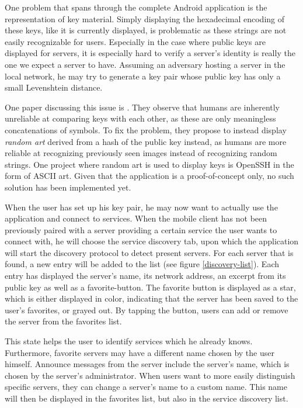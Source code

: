 One problem that spans through the complete Android application is the representation of key material.
Simply displaying the hexadecimal encoding of these keys, like it is currently displayed, is problematic as these strings are not easily recognizable for users.
Especially in the case where public keys are displayed for servers, it is especially hard to verify a server's identity is really the one we expect a server to have.
Assuming an adversary hosting a server in the local network, he may try to generate a key pair whose public key has only a small Levenshtein distance.

One paper discussing this issue is \cite{perrig1999hash}.
They observe that humans are inherently unreliable at comparing keys with each other, as these are only meaningless concatenations of symbols.
To fix the problem, they propose to instead display \emph{random art} derived from a hash of the public key instead, as humans are more reliable at recognizing previously seen images instead of recognizing random strings.
One project where random art is used to display keys is OpenSSH \cite{ylonen1996ssh} in the form of ASCII art.
Given that the application is a proof-of-concept only, no such solution has been implemented yet.

When the user has set up his key pair, he may now want to actually use the application and connect to services.
When the mobile client has not been previously paired with a server providing a certain service the user wants to connect with, he will choose the service discovery tab, upon which the application will start the discovery protocol to detect present servers.
For each server that is found, a new entry will be added to the list (see figure \ref{discovery-list}).
Each entry has displayed the server's name, its network address, an excerpt from its public key as well as a favorite-button.
The favorite button is displayed as a star, which is either displayed in color, indicating that the server has been saved to the user's favorites, or grayed out.
By tapping the button, users can add or remove the server from the favorites list.

This state helps the user to identify services which he already knows.
Furthermore, favorite servers may have a different name chosen by the user himself.
Announce messages from the server include the server's name, which is chosen by the server's administrator.
When users want to more easily distinguish specific servers, they can change a server's name to a custom name.
This name will then be displayed in the favorites list, but also in the service discovery list.

